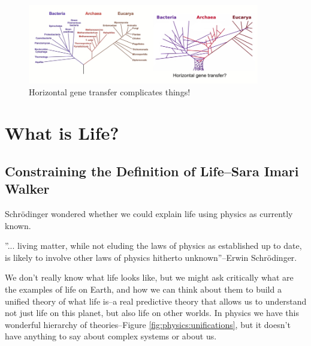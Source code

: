 \documentclass[]{article}
\begin{document}
\begin{figure}[H]
	\caption{Horizontal gene transfer complicates things!}\label{fig:PhylogenyHorizontal} 
	\includegraphics[width=0.9\textwidth]{PhylogenyHorizontal}
\end{figure}



\section{What is Life?}

\subsection[Constraining the Definition of Life]{Constraining the Definition of Life--Sara Imari Walker}

Schrödinger wondered whether we could explain life using physics as currently known.

''... living matter, while not eluding the laws of physics as established up to date, is likely to involve other laws of physics hitherto unknown''--Erwin Schrödinger\cite{schrodinger1944life}.

We don't really know what life looks like, but we might ask critically what are the examples of life on Earth, and how we can think about them to build a unified theory of what life is--a real predictive theory that allows us to understand not just life on this planet, but also life on other worlds. In physics we have this wonderful hierarchy of theories--Figure \ref{fig:physics:unifications}, but it doesn't have anything to say about complex systems or about us.
\end{document}
